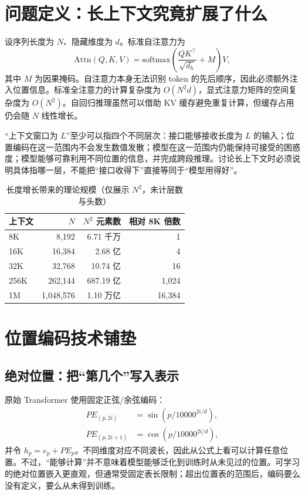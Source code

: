 \documentclass[UTF8,10pt,a4paper,fontset=none]{ctexart}
\begin{document}
\section{问题定义：长上下文究竟扩展了什么}
设序列长度为 $N$、隐藏维度为 $d$。标准自注意力为
\begin{equation}
\mathrm{Attn}(Q,K,V)=\mathrm{softmax}\!\left(\frac{QK^{\top}}{\sqrt{d_h}}+M\right)V,
\end{equation}
其中 $M$ 为因果掩码。自注意力本身无法识别 token 的先后顺序，因此必须额外注入位置信息。标准全注意力的计算复杂度为 $O(N^2d)$，显式注意力矩阵的空间复杂度为 $O(N^2)$。自回归推理虽然可以借助 KV 缓存避免重复计算，但缓存占用仍会随 $N$ 线性增长。

“上下文窗口为 $L$”至少可以指四个不同层次：接口能够接收长度为 $L$ 的输入；位置编码在这一范围内不会发生数值发散；模型在这一范围内仍能保持可接受的困惑度；模型能够可靠利用不同位置的信息，并完成跨段推理。讨论长上下文时必须说明具体指哪一层，不能把“接口收得下”直接等同于“模型用得好”。

\begin{table}[h]
\centering\small
\caption{长度增长带来的理论规模（仅展示 $N^2$，未计层数与头数）}
\begin{tabular}{lrrr}
\toprule
上下文 & $N$ & $N^2$ 元素数 & 相对 8K 倍数\\
\midrule
8K & 8,192 & 6.71 千万 & 1\\
16K & 16,384 & 2.68 亿 & 4\\
32K & 32,768 & 10.74 亿 & 16\\
256K & 262,144 & 687.19 亿 & 1,024\\
1M & 1,048,576 & 1.10 万亿 & 16,384\\
\bottomrule
\end{tabular}
\end{table}

\section{位置编码技术铺垫}
\subsection{绝对位置：把“第几个”写入表示}
原始 Transformer 使用固定正弦/余弦编码\cite{vaswani2017}：
\begin{align}
PE_{(p,2i)} &= \sin(p/10000^{2i/d}),\\
PE_{(p,2i+1)} &= \cos(p/10000^{2i/d}),
\end{align}
并令 $h_p=e_p+PE_p$。不同维度对应不同波长，因此从公式上看可以计算任意位置。不过，“能够计算”并不意味着模型能够泛化到训练时从未见过的位置。可学习的绝对位置嵌入更直观，但通常受固定表长限制；超出位置表的范围后，编码要么没有定义，要么从未得到训练。
\end{document}
